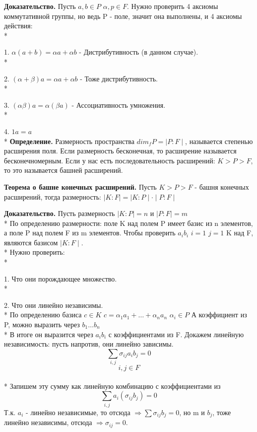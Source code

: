 \documentclass{article}
\begin{document}
{\bf Доказательство.} Пусть $a,b\in P$  $\alpha,p\in F$. 
Нужно проверить 4 аксиомы коммутативной группы, но ведь P - поле, значит она выполнены, и 4 аксиомы действия:\\*

1. $\alpha(a+b)=\alpha a+\alpha b$ - Дистрибутивность (в данном случае).\\*

2. $(\alpha+\beta)a=\alpha a +\alpha b$ - Тоже дистрибутивность.\\*

3. $(\alpha \beta)a=\alpha(\beta a)$ - Ассоциативность умножения.\\*

4. $1a=a$\\*
{\bf Определение.} Размерность пространства $dim_fP=\mid P:F\mid$, называется степенью расширения поля. Если размерность бесконечная, то расширение называется бесконечномерным. Если у нас есть последовательность расширений: $K>P>F$, то это называется башней расширений.

{\bf Теорема о башне конечных расширений.} Пусть $K>P>F$ - башня конечных расширений, тогда размерность: $\mid K:F\mid=\mid K:P\mid\cdot\mid P:F\mid$

{\bf Доказательство.} Пусть размерность $\mid K:P\mid=n$ и $\mid P:F\mid=m$\\*
По определению размерности: поле K над полем P имеет базис из n элементов, а поле P над полем F из m элементов. Чтобы проверить $a_ib_i$  $i=1$ $j=1$    K над F, являются базисом $\mid K:F\mid$.\\*
Нужно проверить:\\*

1. Что они порождающее множество.\\*

2. Что они линейно независимы.\\*
По определению базиса $c\in K$     $c=\alpha_1 a_1+\ldots+\alpha_n a_n$    $\alpha_i\in P$     А коэффициент из P, можно выразить через $b_1\ldots b_n$\\*
В итоге он выразится через $a_i b_i$ с коэффициентами из F. Докажем линейную независимость: пусть напротив, они линейно зависимы. $$\sum_{i,j}\sigma_{ij}a_ib_j=0$$
$$i, j \in F$$\\*
Запишем эту сумму как линейную комбинацию с коэффициентами из $$\sum_{i,j}a_i(\sigma_{ij}b_j)=0$$
Т.к. $a_i$ - линейно независимые, то отсюда $\Rightarrow \sum \sigma_{ij}b_j=0$, но m и $b_j$, тоже линейно независимы, отсюда $\Rightarrow \sigma_{ij}=0$.
\end{document}
